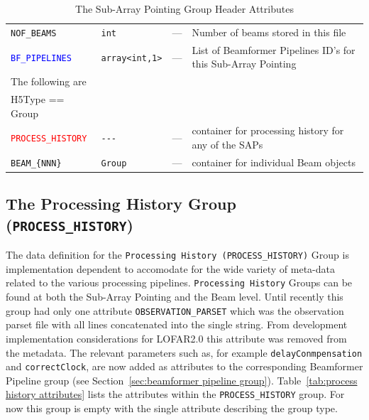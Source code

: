 \documentclass[a4paper,10pt,bibtotoc]{scrartcl}
\begin{document}
\begin{small}
\begin{table}[h]
\begin{small}
\begin{tabular}{|lllp{5.5cm}|}
    \verb|NOF_BEAMS|  & \verb|int| & --- & Number of beams stored in this file \\
    \textcolor{blue}{\texttt{BF\_PIPELINES}} & \verb|array<int,1>| & --- & List of Beamformer Pipelines ID's for this Sub-Array Pointing \\
    \hline
    \sc The following are & \sc & \sc & \\
    \sc H5Type == Group & \sc & \sc & \\
    \hline 
    \textcolor{red}{\texttt{PROCESS\_HISTORY}} & \verb|---| & --- &  container for processing history for any of the SAPs \\
    \verb|BEAM_{NNN}| & \verb|Group| & --- &  container for individual Beam objects \\
    \hline
  \end{tabular}
  \caption{The Sub-Array Pointing Group Header Attributes}
  \label{tab:sub-array pointing attributes}
\end{small}
\end{table}
\end{small}

\clearpage
\subsection{The Processing History Group ({\tt PROCESS\_HISTORY})}
\label{sec:processing history group}

The data definition for the \texttt{Processing History (PROCESS\_HISTORY)} Group is implementation dependent to accomodate for the wide variety of meta-data related to the various processing pipelines. \texttt{Processing History} Groups can be found at both the Sub-Array Pointing and the Beam level. Until recently this group had only one attribute \verb|OBSERVATION_PARSET| which was the observation parset file with all lines concatenated into the single string. From development implementation considerations for LOFAR2.0 this attribute was removed from the metadata. The relevant parameters such as, for example \verb|delayConmpensation| and \verb|correctClock|, are now added as attributes to the corresponding Beamformer Pipeline group (see Section~\ref{sec:beamformer pipeline group}). Table~\ref{tab:process history attributes} lists the attributes within the \verb|PROCESS_HISTORY| group. For now this group is empty with the single attribute describing the group type.
\end{document}
